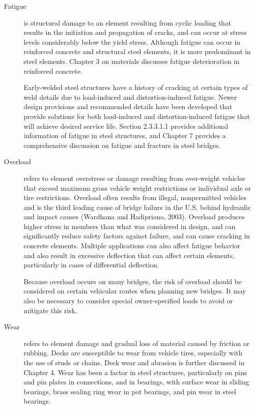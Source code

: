 \begin{description}
  \item [Fatigue] is structural damage to an element resulting from cyclic loading that results in the initiation and  propagation of cracks, and can occur at stress levels considerably below the yield stress. Although fatigue can occur in reinforced concrete and structural steel elements, it is more predominant in steel elements. Chapter 3 on materials discusses fatigue deterioration in reinforced concrete.

  Early-welded steel structures have a history of cracking at certain types of weld details due to load-induced and distortion-induced fatigue. Newer design provisions and recommended details have been developed that provide solutions for both load-induced and distortion-induced fatigue that will achieve desired service life. Section 2.3.3.1.1 provides additional information of fatigue in steel structures, and Chapter 7 provides a comprehensive discussion on fatigue and fracture in steel bridges.
  \item [Overload] refers to element overstress or damage resulting from over-weight vehicles that exceed maximum gross vehicle weight restrictions or individual axle or tire restrictions. Overload often results from illegal, nonpermitted vehicles and is the third leading cause of bridge failure in the U.S. behind hydraulic and impact causes (Wardhana and Hadipriono, 2003). Overload produces higher stress in members than what was considered in design,
  and can significantly reduce safety factors against failure, and can cause cracking in concrete elements. Multiple applications can also affect fatigue behavior and also result in excessive deflection that can affect certain elements, particularly in cases of differential deflection.

  Because overload occurs on many bridges, the risk of overload should be considered on certain vehicular routes when planning new bridges. It may also be necessary to consider special owner-specified loads to avoid or mitigate this risk.
  \item [Wear] refers to element damage and gradual loss of material caused by friction or rubbing. Decks are susceptible to wear from vehicle tires, especially with the use of studs or chains. Deck wear and abrasion is further discussed in Chapter 4. Wear has been a factor in steel structures, particularly on pins and pin plates in connections, and in bearings, with surface wear in sliding bearings, brass sealing ring wear in pot bearings, and pin wear in steel bearings.
\end{description}

